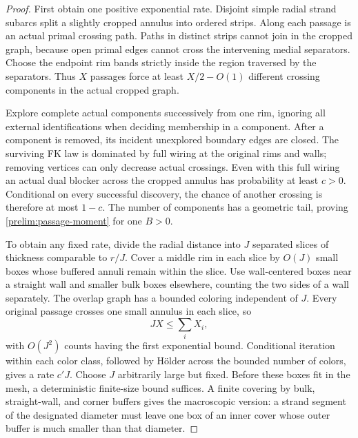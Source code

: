\begin{proof}
First obtain one positive exponential rate. Disjoint simple radial
strand subarcs split a slightly cropped annulus into ordered strips.
Along each passage is an actual primal crossing path. Paths in distinct
strips cannot join in the cropped graph, because open primal edges cannot
cross the intervening medial separators. Choose the endpoint rim bands
strictly inside the region traversed by the separators. Thus $X$ passages
force at least $X/2-O(1)$ different crossing components in the actual
cropped graph.

Explore complete actual components successively from one rim, ignoring
all external identifications when deciding membership in a component.
After a component is removed, its incident unexplored boundary edges
are closed. The surviving FK law is dominated by full wiring at the
original rims and walls; removing vertices can only decrease actual
crossings. Even with this full wiring an actual dual blocker across the
cropped annulus has probability at least $c>0$. Conditional on every
successful discovery, the chance of another crossing is therefore at
most $1-c$. The number of components has a geometric tail, proving
\eqref{prelim:passage-moment} for one $B>0$.

To obtain any fixed rate, divide the radial distance into $J$ separated
slices of thickness comparable to $r/J$. Cover a middle rim in each slice
by $O(J)$ small boxes whose buffered annuli remain within the slice.
Use wall-centered boxes near a straight wall and smaller bulk boxes
elsewhere, counting the two sides of a wall separately. The overlap graph
has a bounded coloring independent of $J$. Every original passage crosses
one small annulus in each slice, so
\[
 JX\le\sum_i X_i,
\]
with $O(J^2)$ counts having the first exponential bound. Conditional
iteration within each color class, followed by H\"older across the
bounded number of colors, gives a rate $c'J$. Choose $J$ arbitrarily
large but fixed. Before these boxes fit in the mesh, a deterministic
finite-size bound suffices. A finite covering by bulk, straight-wall,
and corner buffers gives the macroscopic version: a strand segment of
the designated diameter must leave one box of an inner cover whose
outer buffer is much smaller than that diameter.
\end{proof}

